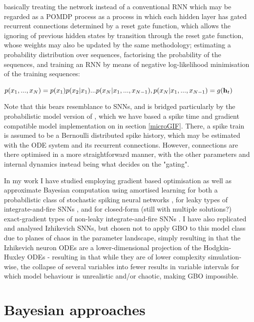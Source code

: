 \documentclass[mphil,deptreport,ianc]{infthesis} %
\begin{document}
basically treating the network instead of a conventional RNN which may be regarded as a POMDP process as a process in which each hidden layer has gated recurrent connections determined by a reset gate function, which allows the ignoring of previous hidden states by transition through the reset gate function, whose weights may also be updated by the same methodology;
estimating a probability distribution over sequences, factorising the probability of the sequences, and training an RNN by means of negative log-likelihood minimisation of the training sequences:

\begin{math}
    p(x_1, ..., x_N) = p(x_1)p(x_2|x_1) ... p(x_N|x_1,...,x_{N-1}), \\
    p(x_N|x_1,...,x_{N-1}) = g(\textbf{h}_t)
\end{math}

Note that this bears resemblance to SNNs, and is bridged particularly by the probabilistic model version of \cite{Rene2020}, which we have based a spike time and gradient compatible model implementation on in section \ref{microGIF}.
There, a spike train is assumed to be a Bernoulli distributed spike history, which may be estimated with the ODE system and its recurrent connections.
However, connections are there optimised in a more straightforward manner, with the other parameters and internal dynamics instead being what decides on the "gating".

In my work I have studied employing gradient based optimisation as well as approximate Bayesian computation using amortised learning for both a probabilistic class of stochastic spiking neural networks \cite{Rene2020}, for leaky types of integrate-and-fire SNNs \cite{allen_glif_white_paper}, and for closed-form (still with multiple solutions?) exact-gradient types of non-leaky integrate-and-fire SNNs \cite{Huh2017}.
I have also replicated and analysed Izhikevich SNNs, but chosen not to apply GBO to this model class due to planes of chaos in the parameter landscape, simply resulting in that the Izhikevich neuron ODEs are a lower-dimensional projection of the Hodgkin-Huxley ODEs - resulting in that while they are of lower complexity simulation-wise, the collapse of several variables into fewer results in variable intervals for which model behaviour is unrealistic and/or chaotic, making GBO impossible.


\section{Bayesian approaches}
\end{document}

